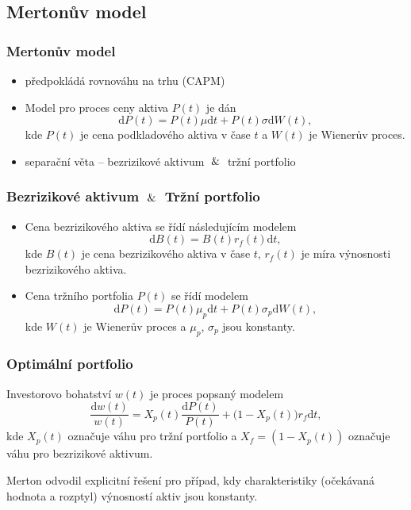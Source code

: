 \documentclass[xcolor=dvipsnames]{beamer}
\theoremstyle{definition} \newtheorem{definice}[veta]{Definice}
\theoremstyle{remark}
\begin{document}
\subsection{Mertonův model}
\begin{frame}
  \frametitle{Mertonův model}
  \begin{itemize}
   \item předpokládá rovnováhu na trhu (CAPM)
   \item Model pro proces ceny aktiva $P(t)$ je dán
       $$\mathrm{d}P(t)=P(t)\mu\mathrm{d}t+P(t)\sigma\mathrm{d}W(t),$$
      kde $P(t)$ je cena podkladového aktiva v čase $t$ a $W(t)$ je Wienerův proces.
   \item separační věta -- bezrizikové aktivum $\And$ tržní portfolio
  \end{itemize}    %
 \end{frame}
  
 \begin{frame}
  \frametitle{Bezrizikové aktivum $\And$ Tržní portfolio}
   \begin{itemize}
   \item Cena bezrizikového aktiva se řídí následujícím modelem
    $$\mathrm{d}B(t)=B(t)r_f(t)\mathrm{d}t,$$
    kde $B(t)$ je cena bezrizikového aktiva v čase $t$, $r_f(t)$ je míra výnosnosti bezrizikového aktiva.
   
   \item Cena tržního portfolia $P(t)$ se řídí modelem
    $$\mathrm{d}P(t)=P(t)\mu_p\mathrm{d}t+P(t)\sigma_p\mathrm{d}W(t),$$
    kde $W(t)$ je Wienerův proces a $\mu_p$, $\sigma_p$ jsou konstanty. 
  \end{itemize} 
\end{frame}

\begin{frame}
  \frametitle{Optimální portfolio}
Investorovo bohatství $w(t)$ je proces popsaný modelem
$$\frac{\mathrm{d}w(t)}{w(t)}=X_p(t)\frac{\mathrm{d}P(t)}{P(t)}+\big(1-X_p(t)\big)r_f\mathrm{d}t,$$
kde $X_p(t)$ označuje váhu pro tržní portfolio a $X_f=(1-X_p(t))$ označuje váhu pro bezrizikové aktivum. 

\vspace{1cm}
Merton odvodil explicitní řešení pro případ, kdy charakteristiky (očekávaná hodnota a rozptyl) výnosností aktiv jsou konstanty.
\end{frame}
\end{document}

